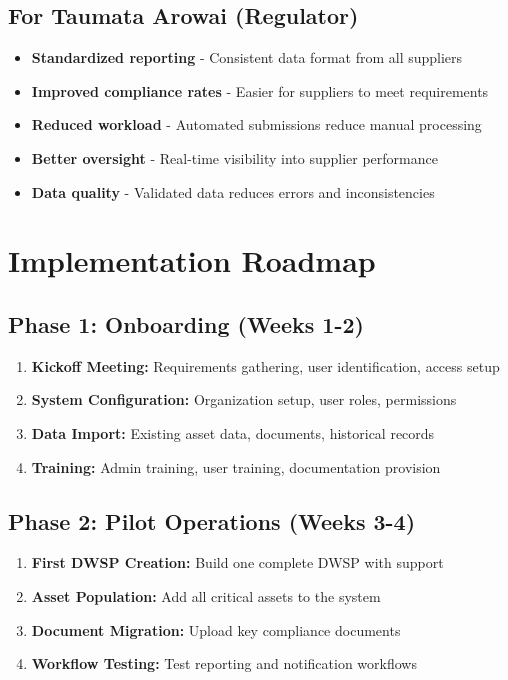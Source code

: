 \documentclass[11pt,a4paper]{article}
\begin{document}
\subsection{For Taumata Arowai (Regulator)}

\begin{itemize}[leftmargin=*, itemsep=0.5em]
    \item \textbf{Standardized reporting} - Consistent data format from all suppliers
    \item \textbf{Improved compliance rates} - Easier for suppliers to meet requirements
    \item \textbf{Reduced workload} - Automated submissions reduce manual processing
    \item \textbf{Better oversight} - Real-time visibility into supplier performance
    \item \textbf{Data quality} - Validated data reduces errors and inconsistencies
\end{itemize}

\newpage

\section{Implementation Roadmap}

\subsection{Phase 1: Onboarding (Weeks 1-2)}

\begin{enumerate}[leftmargin=*, itemsep=0.3em]
    \item \textbf{Kickoff Meeting:} Requirements gathering, user identification, access setup
    \item \textbf{System Configuration:} Organization setup, user roles, permissions
    \item \textbf{Data Import:} Existing asset data, documents, historical records
    \item \textbf{Training:} Admin training, user training, documentation provision
\end{enumerate}

\subsection{Phase 2: Pilot Operations (Weeks 3-4)}

\begin{enumerate}[leftmargin=*, itemsep=0.3em]
    \item \textbf{First DWSP Creation:} Build one complete DWSP with support
    \item \textbf{Asset Population:} Add all critical assets to the system
    \item \textbf{Document Migration:} Upload key compliance documents
    \item \textbf{Workflow Testing:} Test reporting and notification workflows
\end{enumerate}
\end{document}
